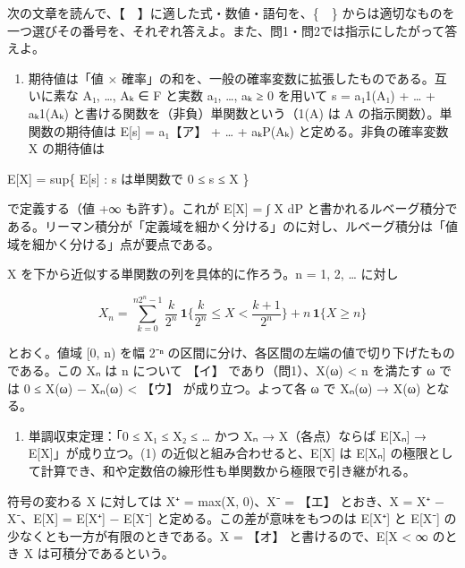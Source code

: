 \documentclass[
  10pt,
  a4paper,
]{article}
\providecommand{\tightlist}{%
  \setlength{\itemsep}{0pt}\setlength{\parskip}{0pt}}
\begin{document}
次の文章を読んで、【　】に適した式・数値・語句を、\{　\}
からは適切なものを一つ選びその番号を、それぞれ答えよ。また、問1・問2では指示にしたがって答えよ。

\begin{enumerate}
\def\labelenumi{(\arabic{enumi})}
\tightlist
\item
  期待値は「値 ×
  確率」の和を、一般の確率変数に拡張したものである。互いに素な
  A{\fallbackfont ₁}, \ldots, A{\fallbackfont ₖ} ∈ F と実数
  a{\fallbackfont ₁}, \ldots, a{\fallbackfont ₖ} ≥ 0 を用いて s =
  a{\fallbackfont ₁}1(A{\fallbackfont ₁}) + \ldots{} +
  a{\fallbackfont ₖ}1(A{\fallbackfont ₖ})
  と書ける関数を（非負）単関数という（1(A) は A
  の指示関数）。単関数の期待値は E{[}s{]} = a{\fallbackfont ₁}【ア】 +
  \ldots{} + a{\fallbackfont ₖ}P(A{\fallbackfont ₖ})
  と定める。非負の確率変数 X の期待値は
\end{enumerate}

E{[}X{]} = sup\{ E{[}s{]} : s は単関数で 0 ≤ s ≤ X \}

で定義する（値 +∞ も許す）。これが E{[}X{]} = ∫ X dP
と書かれるルベーグ積分である。リーマン積分が「定義域を細かく分ける」のに対し、ルベーグ積分は「値域を細かく分ける」点が要点である。

X を下から近似する単関数の列を具体的に作ろう。n = 1, 2, \ldots{} に対し

\[X_n = \sum_{k=0}^{n2^n - 1} \frac{k}{2^n}\, \mathbf{1}\Big\{\frac{k}{2^n} \le X < \frac{k+1}{2^n}\Big\} + n\, \mathbf{1}\{X \ge n\}\]

とおく。値域 {[}0, n) を幅 2{\fallbackfont ⁻ⁿ}
の区間に分け、各区間の左端の値で切り下げたものである。この
X{\fallbackfont ₙ} は n について 【イ】 であり（問1）、X(ω) \textless{}
n を満たす ω では 0 ≤ X(ω) − X{\fallbackfont ₙ}(ω) \textless{} 【ウ】
が成り立つ。よって各 ω で X{\fallbackfont ₙ}(ω) → X(ω) となる。

\begin{enumerate}
\def\labelenumi{(\arabic{enumi})}
\setcounter{enumi}{1}
\tightlist
\item
  単調収束定理：「0 ≤ X{\fallbackfont ₁} ≤ X{\fallbackfont ₂} ≤ \ldots{}
  かつ X{\fallbackfont ₙ} → X（各点）ならば E{[}X{\fallbackfont ₙ}{]} →
  E{[}X{]}」が成り立つ。(1) の近似と組み合わせると、E{[}X{]} は
  E{[}X{\fallbackfont ₙ}{]}
  の極限として計算でき、和や定数倍の線形性も単関数から極限で引き継がれる。
\end{enumerate}

符号の変わる X に対しては X{\fallbackfont ⁺} = max(X,
0)、X{\fallbackfont ⁻} = 【エ】 とおき、X = X{\fallbackfont ⁺} −
X{\fallbackfont ⁻}、E{[}X{]} = E{[}X{\fallbackfont ⁺}{]} −
E{[}X{\fallbackfont ⁻}{]} と定める。この差が意味をもつのは
E{[}X{\fallbackfont ⁺}{]} と E{[}X{\fallbackfont ⁻}{]}
の少なくとも一方が有限のときである。\textbar X\textbar{} = 【オ】
と書けるので、E{[}\textbar X\textbar{]} \textless{} ∞ のとき X
は可積分であるという。
\end{document}
